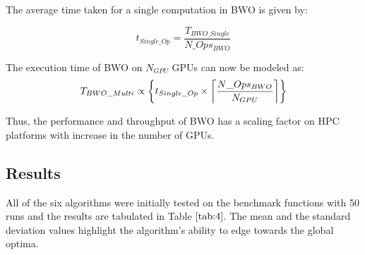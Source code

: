 \documentclass[conference]{IEEEtran}
\theoremstyle{definition}
\begin{document}
The average time taken for a single computation in BWO is given by:

{\scriptsize
\begin{equation}
t_{Single\_Op} = \frac{T_{BWO\_Single}}{N\_Ops_{BWO}}
\end{equation}
}%

The execution time of BWO on $N_{GPU}$ GPUs can now be modeled as:
\DeclarePairedDelimiter{\ceil}{\lceil}{\rceil}
{\scriptsize
\begin{equation}\label{e26}
T_{BWO\_Multi} \propto \bigg\{t_{Single\_Op} \times \ceil*{\frac{N\_Ops_{BWO}}{N_{GPU}}}\bigg\} 
\end{equation}
}%

% 
% 

Thus, the performance and throughput of BWO has a scaling factor on HPC platforms with increase in the number of GPUs. 

\subsection{Results}

All of the six algorithms were initially tested on the benchmark functions with 50 runs and the results are tabulated in Table $\ref{tab:4}$. The mean and the standard deviation values highlight the algorithm's ability to edge towards the global optima. 
\end{document}
